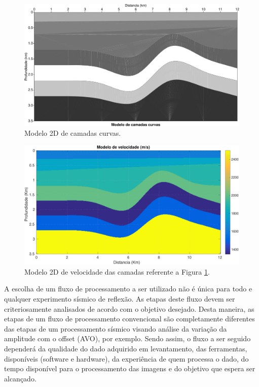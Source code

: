 \begin{landscape}
\begin{figure}[H]
\centering
\includegraphics[totalheight=14cm]{figuras/cap2/vagarosidade.pdf}
\caption{Modelo 2D de camadas curvas.}
\label{fig:vagarosidade}
\end{figure}
\end{landscape}

\begin{landscape}
\begin{figure}[H]
\centering
\includegraphics[totalheight=14cm]{figuras/cap2/modelo_de_velocidade.pdf}
\caption{Modelo 2D de velocidade das camadas referente a Figura \ref{fig:vagarosidade}.}
\label{fig:modelo_velocidade}
\end{figure}
\end{landscape}

A escolha de um fluxo de processamento a ser utilizado não é única para todo e qualquer experimento sísmico de reflexão. As etapas deste fluxo devem ser criteriosamente analisados de acordo com o objetivo desejado. Desta maneira, as etapas de um fluxo de processamento convencional são completamente diferentes das etapas de um processamento sísmico visando análise da variação da amplitude com o offset (AVO), por exemplo. Sendo assim, o fluxo a ser seguido dependerá da qualidade do dado adquirido em levantamento, das ferramentas, disponíveis (software e hardware), da experiência de quem processa o dado, do tempo disponível para o processamento das imagens e do objetivo que espera ser alcançado. \citep{Soares(2009)}

